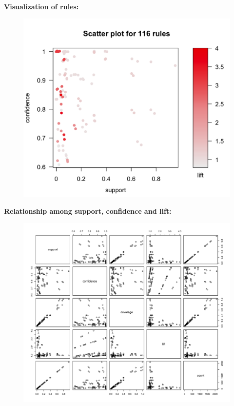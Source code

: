\documentclass{article}
\begin{document}
\textbf{Visualization of rules:}
\begin{figure}[H]
    \includegraphics[width=1\textwidth]{Fig11}
\end{figure}

\textbf{Relationship among support, confidence and lift:}
\begin{figure}[H]
    \includegraphics[width=1\textwidth]{Fig12}
\end{figure}
\end{document}
